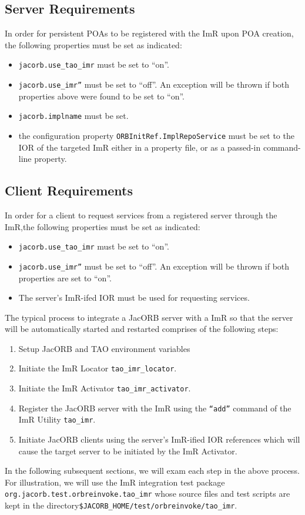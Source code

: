 \subsection{Server Requirements}

In order for persistent POAs to be registered with the ImR upon POA
creation, the following properties must be set as indicated:
\begin{itemize}
    \item {\tt jacorb.use\_tao\_imr} must be set to “on”.
    \item {\tt jacorb.use\_imr”} must be set to “off”.  An exception will be thrown if
              both properties above were found to be set to “on”.
    \item {\tt jacorb.implname} must be set.
    \item the configuration  property {\tt ORBInitRef.ImplRepoService}
              must be set to the IOR of the targeted ImR either in a property file,
              or as a passed-in command-line property.
\end{itemize}

\subsection{Client Requirements}

In order for a client to request services from a registered server through the
ImR,the following properties must be set as indicated:
\begin{itemize}
    \item {\tt jacorb.use\_tao\_imr} must be set to “on”.
    \item {\tt jacorb.use\_imr”} must be set to “off”.  An exception will be thrown if
              both properties are set to “on”.
    \item The server's ImR-ifed IOR must be used for requesting services.
\end{itemize}

The typical process to integrate a JacORB server with a ImR so that the
server will be automatically started and restarted comprises of the following
steps:
\begin{enumerate}
    \item Setup JacORB and TAO environment variables
    \item Initiate the ImR Locator {\tt tao\_imr\_locator}.
    \item Initiate the ImR Activator {\tt tao\_imr\_activator}.
    \item Register the JacORB server with the ImR using the
             {\tt “add”} command of the ImR Utility {\tt tao\_imr}.
    \item Initiate JacORB clients using the server's ImR-ified IOR
              references which will cause the target server to be initiated by
              the ImR Activator.
\end{enumerate}
In the following subsequent sections, we will exam each step in the above
process.  For illustration, we will use the ImR integration test package
{\tt org.jacorb.test.orbreinvoke.tao\_imr} whose source files and test scripts are kept
in the directory{\tt \$JACORB\_HOME/test/orbreinvoke/tao\_imr}.

